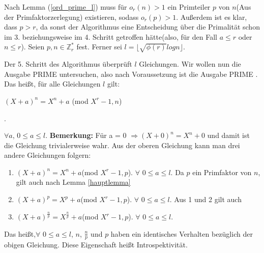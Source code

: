 \documentclass[12pt,oneside]{article}
\theoremstyle{remark}
\theoremstyle{definition}
\begin{document}
\smallskip

Nach Lemma (\ref{ord_prime_l}) muss für  $o_{r}(n) > 1$ ein Primteiler $p$ von $n$(Aus der Primfaktorzerlegung) existieren, sodass $o_{r}(p) > 1$. Außerdem ist es klar, dass $p > r$, da sonst der Algorithmus eine Entscheidung über die Primalität schon im 3. beziehungsweise im 4. Schritt getroffen hätte(also, für den Fall $a \leq r$ oder $n \leq r$). Seien $p,n \in \mathbb{Z}_{r}^{*}$ fest. Ferner sei  $l = \lfloor \sqrt{\phi(r)} log n \rfloor$.\newline\newline

Der 5. Schritt des Algorithmus überprüft $l$ Gleichungen. Wir wollen nun die Ausgabe PRIME untersuchen, also nach Voraussetzung ist die Ausgabe PRIME . Das heißt, für alle Gleichungen $l$ gilt:\newline\newline
\centerline{$(X + a)^n = X^n + a $ (mod $X^r - 1, n$)}.

$\forall a$, $ 0 \leq a \leq l$.\newline\newline
\textbf{Bemerkung:} Für a = 0 $\Rightarrow (X + 0)^n = X^n + 0$ und damit ist die Gleichung trivialerweise wahr.\newline\newline 
Aus der oberen Gleichung kann man drei andere Gleichungen folgern:
\begin{enumerate}
    \item $(X + a)^n = X^n + a $(mod $X^r - 1, p$).
$\forall$ $ 0 \leq a \leq l$.\newline\newline  
Da $p$ ein Primfaktor von $n$, gilt auch nach Lemma \ref{hauptlemma} \newline
\item $(X + a)^p = X^p + a $(mod $X^r - 1, p$).
$\forall$ $0 \leq a \leq l$.\newline\newline
Aus 1 und 2 gilt auch\newline
\item $(X + a)^{\frac{n}{p}} = X^{\frac{n}{p}} + a $(mod $X^r - 1, p$).
$\forall$ $0 \leq a \leq l$.\newline\newline
\end{enumerate}

Das heißt,$\forall$ $0 \leq a \leq l$, $n$, $\frac{n}{p}$ und $p$ haben ein identisches Verhalten bezüglich der obigen Gleichung. Diese Eigenschaft heißt Introspektivität.\newline    
\end{document}
